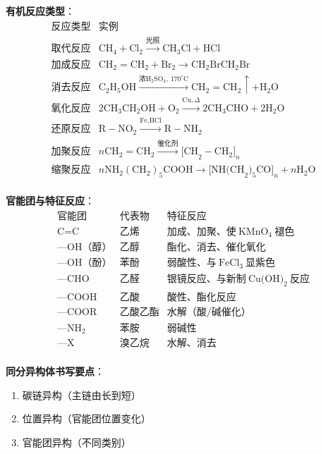 \textbf{有机反应类型}：
\[
\begin{array}{c|c}
\text{反应类型} & \text{实例} \\ \hline
\text{取代反应} & \text{CH}_4 + \text{Cl}_2 \xrightarrow{\text{光照}} \text{CH}_3\text{Cl} + \text{HCl} \\
\text{加成反应} & \text{CH}_2=\text{CH}_2 + \text{Br}_2 \to \text{CH}_2\text{BrCH}_2\text{Br} \\
\text{消去反应} & \text{C}_2\text{H}_5\text{OH} \xrightarrow{\text{浓}\text{H}_2\text{SO}_4,\ 170^\circ\text{C}} \text{CH}_2=\text{CH}_2\uparrow + \text{H}_2\text{O} \\
\text{氧化反应} & 2\text{CH}_3\text{CH}_2\text{OH} + \text{O}_2 \xrightarrow{\text{Cu},\Delta} 2\text{CH}_3\text{CHO} + 2\text{H}_2\text{O} \\
\text{还原反应} & \text{R}-\text{NO}_2 \xrightarrow{\text{Fe,HCl}} \text{R}-\text{NH}_2 \\
\text{加聚反应} & n\text{CH}_2=\text{CH}_2 \xrightarrow{\text{催化剂}} \text{[CH}_2-\text{CH}_2]_n \\
\text{缩聚反应} & n\text{NH}_2(\text{CH}_2)_5\text{COOH} \to \text{[NH(CH}_2)_5\text{CO]}_n + n\text{H}_2\text{O} \\
\end{array}
\]

\textbf{官能团与特征反应}：
\[
\begin{array}{c|c|c}
\text{官能团} & \text{代表物} & \text{特征反应} \\ \hline
\text{C=C} & \text{乙烯} & \text{加成、加聚、使}\ \text{KMnO}_4\ \text{褪色} \\
\text{—OH（醇）} & \text{乙醇} & \text{酯化、消去、催化氧化} \\
\text{—OH（酚）} & \text{苯酚} & \text{弱酸性、与}\ \text{FeCl}_3\ \text{显紫色} \\
\text{—CHO} & \text{乙醛} & \text{银镜反应、与新制}\ \text{Cu(OH)}_2\ \text{反应} \\
\text{—COOH} & \text{乙酸} & \text{酸性、酯化反应} \\
\text{—COOR} & \text{乙酸乙酯} & \text{水解（酸/碱催化）} \\
\text{—NH}_2 & \text{苯胺} & \text{弱碱性} \\
\text{—X} & \text{溴乙烷} & \text{水解、消去} \\
\end{array}
\]

\textbf{同分异构体书写要点}：
\begin{enumerate}
  \item 碳链异构（主链由长到短）
  \item 位置异构（官能团位置变化）
  \item 官能团异构（不同类别）
\end{enumerate}

